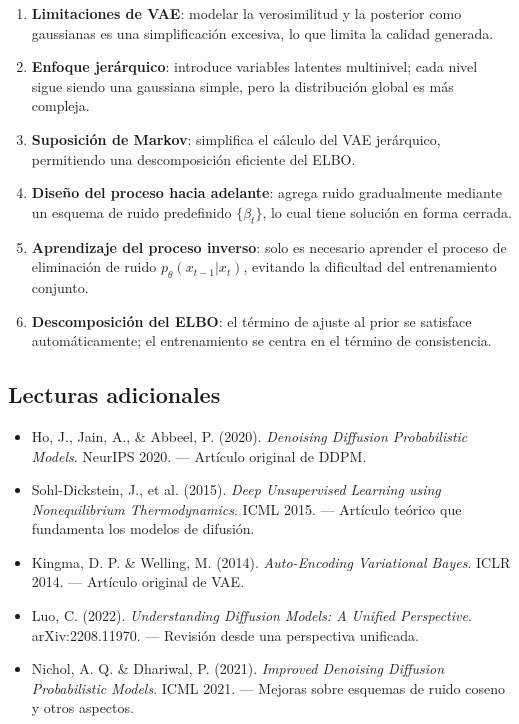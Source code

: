 \documentclass[a4paper]{article}
\begin{document}
\begin{enumerate}
    \item \textbf{Limitaciones de VAE}: modelar la verosimilitud y la posterior como gaussianas es una simplificación excesiva, lo que limita la calidad generada.
    \item \textbf{Enfoque jerárquico}: introduce variables latentes multinivel; cada nivel sigue siendo una gaussiana simple, pero la distribución global es más compleja.
    \item \textbf{Suposición de Markov}: simplifica el cálculo del VAE jerárquico, permitiendo una descomposición eficiente del ELBO.
    \item \textbf{Diseño del proceso hacia adelante}: agrega ruido gradualmente mediante un esquema de ruido predefinido $\{\beta_t\}$, lo cual tiene solución en forma cerrada.
    \item \textbf{Aprendizaje del proceso inverso}: solo es necesario aprender el proceso de eliminación de ruido $p_\theta(x_{t-1}|x_t)$, evitando la dificultad del entrenamiento conjunto.
    \item \textbf{Descomposición del ELBO}: el término de ajuste al prior se satisface automáticamente; el entrenamiento se centra en el término de consistencia.
\end{enumerate}

\subsection{Lecturas adicionales}

\begin{itemize}
    \item Ho, J., Jain, A., \& Abbeel, P. (2020). \textit{Denoising Diffusion Probabilistic Models}. NeurIPS 2020. --- Artículo original de DDPM.
    \item Sohl-Dickstein, J., et al. (2015). \textit{Deep Unsupervised Learning using Nonequilibrium Thermodynamics}. ICML 2015. --- Artículo teórico que fundamenta los modelos de difusión.
    \item Kingma, D. P. \& Welling, M. (2014). \textit{Auto-Encoding Variational Bayes}. ICLR 2014. --- Artículo original de VAE.
    \item Luo, C. (2022). \textit{Understanding Diffusion Models: A Unified Perspective}. arXiv:2208.11970. --- Revisión desde una perspectiva unificada.
    \item Nichol, A. Q. \& Dhariwal, P. (2021). \textit{Improved Denoising Diffusion Probabilistic Models}. ICML 2021. --- Mejoras sobre esquemas de ruido coseno y otros aspectos.
\end{itemize}

\end{document}
